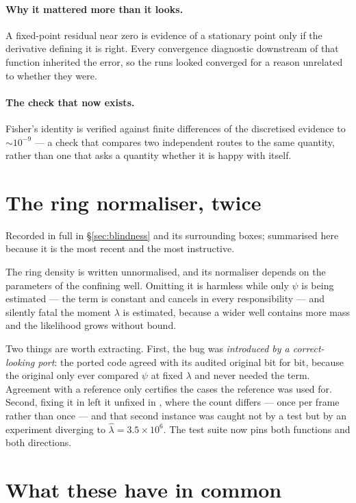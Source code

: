 \paragraph{Why it mattered more than it looks.} A fixed-point residual near zero is evidence of a
stationary point only if the derivative defining it is right. Every convergence diagnostic
downstream of that function inherited the error, so the runs looked converged for a reason
unrelated to whether they were.

\paragraph{The check that now exists.} Fisher's identity is verified against finite differences
of the discretised evidence to ${\sim}10^{-9}$ --- a check that compares two independent routes to
the same quantity, rather than one that asks a quantity whether it is happy with itself.

\section{The ring normaliser, twice}
\label{sec:corr-ring}

Recorded in full in \S\ref{sec:blindness} and its surrounding boxes; summarised here because it
is the most recent and the most instructive.

The ring density is written unnormalised, and its normaliser depends on the parameters of the
confining well. Omitting it is harmless while only $\psi$ is being estimated --- the term is
constant and cancels in every responsibility --- and silently fatal the moment $\lambda$ is
estimated, because a wider well contains more mass and the likelihood grows without bound.

Two things are worth extracting. First, the bug was \emph{introduced by a correct-looking
port}: the ported code agreed with its audited original bit for bit, because the original only
ever compared $\psi$ at fixed $\lambda$ and never needed the term. Agreement with a reference
only certifies the cases the reference was used for. Second, fixing it in
 left it unfixed in
, where the count differs --- once per frame rather than
once --- and that second instance was caught not by a test but by an experiment diverging to
$\hat\lambda = 3.5\times10^{6}$. The test suite now pins both functions and both directions.

\section{What these have in common}

